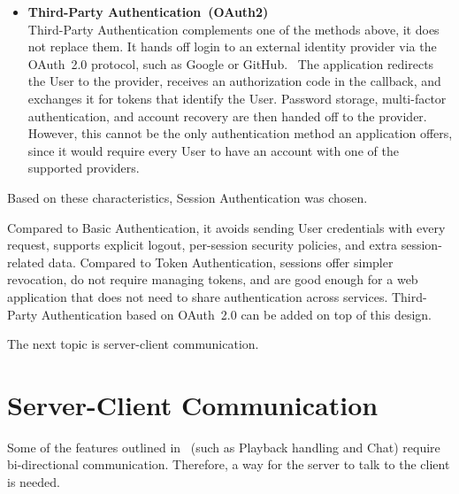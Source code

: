 \begin{itemize}
    Tokens come in two common variants.
    A \textit{database-backed token} is stored on the server alongside the
    User record and looked up on every request, similar to a session but
    sent in a header instead of a cookie.
    A \textit{self-contained token}, such as a JSON Web Token~(JWT)~\parencite{rfc7519_jwt}, holds
    the User identity and permissions in its payload and is verified by
    signature, with no lookup.
    Self-contained tokens simplify horizontal scaling, but revocation is hard.
    Once issued, a token stays valid until it expires, unless a revocation
    list is kept, which adds state and coordination.
    In both variants, the Frontend has to attach the token to every request
    and handle refresh explicitly, while cookies are sent by the browser
    automatically.

    \item \textbf{Third-Party Authentication~(OAuth2)} \\
    Third-Party Authentication complements one of the methods above,
    it does not replace them.
    It hands off login to an external identity provider via the OAuth~2.0
    protocol, such as Google or GitHub.~\parencite{oauth2}
    The application redirects the User to the provider, receives an
    authorization code in the callback, and exchanges it for tokens that
    identify the User.
    Password storage, multi-factor authentication, and account recovery are
    then handed off to the provider.
    However, this cannot be the only authentication method an application
    offers, since it would require every User to have an account with one of
    the supported providers.
\end{itemize}

Based on these characteristics, Session Authentication was chosen.

Compared to Basic Authentication, it avoids sending User credentials with every request,
supports explicit logout, per-session security policies, and extra session-related data.
Compared to Token Authentication, sessions offer simpler revocation, do not
require managing tokens, and are good enough for a web
application that does not need to share authentication across services.
Third-Party Authentication based on OAuth~2.0 can be added on top of this
design.

The next topic is server-client communication.


\section{Server-Client Communication}\label{sec:server_client_communication}
Some of the features outlined in ~(such as Playback handling
and Chat) require bi-directional communication.
Therefore, a way for the server to talk to the client is needed.

